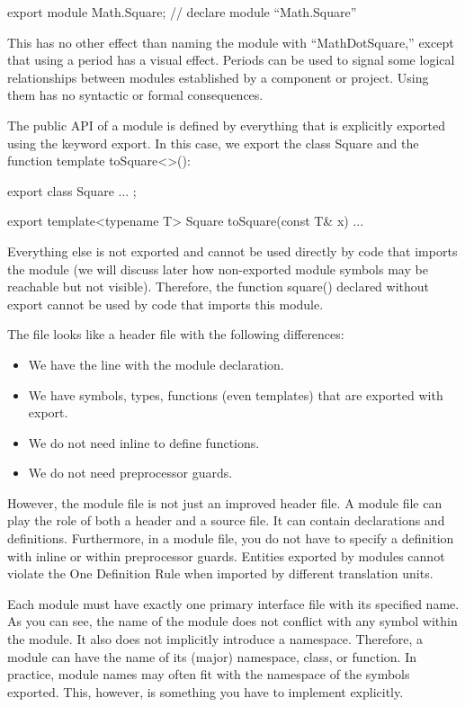 \begin{cpp}
export module Math.Square; // declare module “Math.Square”
\end{cpp}

This has no other effect than naming the module with “MathDotSquare,” except that using a period has a visual effect. Periods can be used to signal some logical relationships between modules established by a component or project. Using them has no syntactic or formal consequences.

The public API of a module is defined by everything that is explicitly exported using the keyword export. In this case, we export the class Square and the function template toSquare<>():

\begin{cpp}
export class Square {
	...
};

export template<typename T>
Square toSquare(const T& x) {
	...
}
\end{cpp}

Everything else is not exported and cannot be used directly by code that imports the module (we will discuss later how non-exported module symbols may be reachable but not visible). Therefore, the function square() declared without export cannot be used by code that imports this module.

The file looks like a header file with the following differences:

\begin{itemize}
\item 
We have the line with the module declaration.

\item 
We have symbols, types, functions (even templates) that are exported with export.

\item 
We do not need inline to define functions.

\item 
We do not need preprocessor guards.
\end{itemize}

However, the module file is not just an improved header file. A module file can play the role of both a header and a source file. It can contain declarations and definitions. Furthermore, in a module file, you do not have to specify a definition with inline or within preprocessor guards. Entities exported by modules cannot violate the One Definition Rule when imported by different translation units.

Each module must have exactly one primary interface file with its specified name. As you can see, the name of the module does not conflict with any symbol within the module. It also does not implicitly introduce a namespace. Therefore, a module can have the name of its (major) namespace, class, or function. In practice, module names may often fit with the namespace of the symbols exported. This, however, is something you have to implement explicitly.

